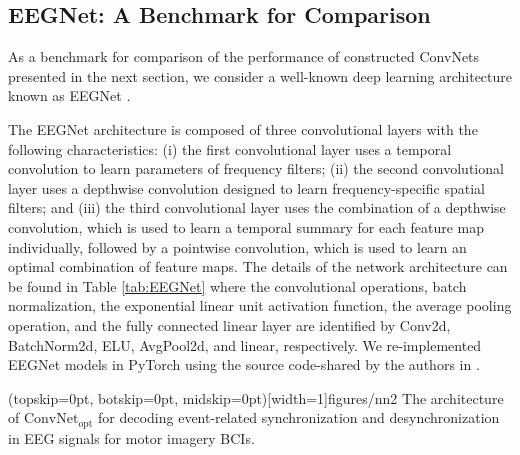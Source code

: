 \documentclass{ieeeaccess}
\begin{document}
    
    \subsection{EEGNet: A Benchmark for Comparison}
    \label{sec:EEGnet}
    As a benchmark for comparison of the performance of constructed ConvNets presented in the next section, we consider a well-known deep learning architecture known as EEGNet \cite{lawhern2016eegnet}.
    
    The EEGNet architecture is composed of three convolutional layers with the following characteristics: (i) the first convolutional layer uses a temporal convolution to learn parameters of frequency filters; (ii) the second convolutional layer uses a depthwise convolution designed to learn frequency-specific spatial filters; and (iii) the third convolutional layer uses the combination of a depthwise convolution,  which is used to learn a temporal summary for each feature map individually, followed by a pointwise convolution, which is used to learn an optimal combination of feature maps. The details of the network architecture can be found in Table \ref{tab:EEGNet} where the convolutional operations,  batch normalization,  the exponential linear unit activation function, the average pooling operation, and the fully connected linear layer are identified by Conv2d,  BatchNorm2d,  ELU,  AvgPool2d,  and linear,  respectively. We re-implemented EEGNet models in PyTorch using the source code-shared by the authors in \cite{lawhern2016eegnet}. 
    
    \Figure[t!](topskip=0pt, botskip=0pt, midskip=0pt)[width=1\linewidth]{figures/nn2}
    {The architecture of $\text{ConvNet}_{\text{opt}}$ for decoding event-related synchronization and desynchronization in EEG signals for motor imagery BCIs.\label{fig:figerders}}
    
\end{document}
